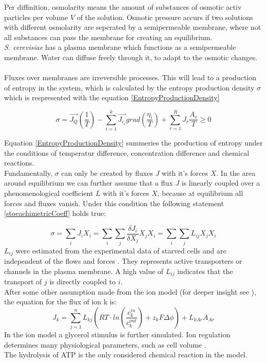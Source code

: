 Per diffinition, osmolarity means the amount of substances of osmotic activ particles per volume $V$ of the solution. Osmotic pressure accurs if two solutions with different osmolarity are seperated by a semipermeable membrane, where not all substances can pass the membrane for creating an equilibrium.\\
\emph{S. cerevisiae} has a plasma membrane which functions as a semipermeable membrane. Water can diffuse freely through it, to adapt to the osmotic changes. \\\\

Fluxes over membranes are irreversible processes. This will lead to a production of entropy in the system, which is calculated by the entropy production density $\sigma$ which is respresented with the equation \ref{EntropyProductionDensity}

\begin{equation}\label{EntropyProductionDensity}
	\sigma = \vec{J_Q}\left(\frac{1}{T}\right) - \sum_{i=1}^{k}\vec{J_{c_i}}grad \left(\frac{\eta _i}{T}\right) + \sum_{r=1}^{R}J_r \frac{A_r}{T} \geq 0
\end{equation}

Equation \ref{EntropyProductionDensity} summeries the production of entropy under the conditions of temperatur difference, concentration difference and chemical reactions. \\
Fundamentally, $\sigma$ can only be created by fluxes $J$ with it’s forces $X$. In the area around equilibrium we can further assume that a flux $J$ is linearly coupled over a phenomenological coefficient $L$ with it’s forces $X$, because at equilibrium all forces and fluxes vanish. Under this condition the following statement \ref{stoeachimetricCoeff} holds true:

\begin{equation}\label{stoeachimetricCoeff}
	\sigma = \sum_{i}J_i X_i = \sum_{i}\sum_{j} \frac{\delta J_i}{\delta X_j}X_j X_i= \sum_{i}\sum_{j}L_{ij}X_j X_i
\end{equation}
$L_{ij}$ were estimated from the experimental data of starved cells and are independent of the flows and forces \cite{Gerber_2016}. They represents active transporters or channels in the plasma membrane. A high value of $L_{ij}$ indicates that the transport of $j$ is directly coupled to $i$.\\
After some other assumption made from the ion model (for deeper insight see \cite{Gerber_2016}), the equation for the flux of ion k is:
\begin{equation*}
J_k = \sum_{j=1}^n L_{kj}(RT\cdot ln\left(\frac{c_k^{in}}{c_k^{out}}\right) + z_kF\Delta \phi ) + L_{kAr}A_{Ar}
\end{equation*}
In the ion model a glycerol stimulus is further simulated. Ion regulation determines many physiological parameters, such as cell volume \cite{Ke_2013}.\\
The hydrolysis of ATP is the only considered chemical reaction in the model.

